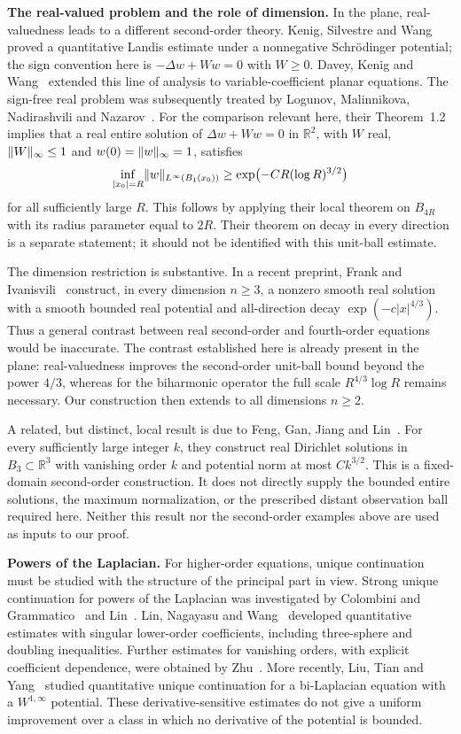 \documentclass[11pt,a4paper,leqno]{amsart}
\numberwithin{equation}{section}
\theoremstyle{landisplain}
\theoremstyle{landisdefinition}
\theoremstyle{landisremark}
\newcommand{\R}{\mathbb R}
\DeclarePairedDelimiter{\norm}{\lVert}{\rVert}
\begin{document}
\smallskip\noindent\textbf{The real-valued problem and the role of dimension.}
In the plane, real-valuedness leads to a different second-order
theory. Kenig, Silvestre and Wang~\cite{KSW} proved a quantitative
Landis estimate under a nonnegative Schr\"odinger potential; the
sign convention here is $-\Delta w+Ww=0$ with $W\ge0$.
Davey, Kenig and Wang~\cite{DKW} extended this line of analysis
to variable-coefficient planar equations. The sign-free real
problem was subsequently treated by Logunov, Malinnikova,
Nadirashvili and Nazarov~\cite{LMNN}. For the comparison relevant
here, their Theorem~1.2 implies that a real entire solution of
$\Delta w+Ww=0$ in $\R^2$, with $W$ real,
$\norm W_\infty\le1$ and $w(0)=\norm w_\infty=1$, satisfies
\[
 \inf_{|x_0|=R}\norm{w}_{L^\infty(B_1(x_0))}
 \ge \exp\bigl(-CR(\log R)^{3/2}\bigr)
\]
for all sufficiently large $R$. This follows by applying their
local theorem on $B_{4R}$ with its radius parameter equal to
$2R$. Their theorem on decay in every direction is a separate
statement; it should not be identified with this unit-ball estimate.

The dimension restriction is substantive. In a recent preprint,
Frank and Ivanisvili~\cite[Theorem~1]{FI} construct, in every
dimension $n\ge3$, a nonzero smooth real solution with a smooth
bounded real potential and all-direction decay
$\exp(-c|x|^{4/3})$. Thus a general contrast between real
second-order and fourth-order equations would be inaccurate.
The contrast established here is already present in the plane:
real-valuedness improves the second-order unit-ball bound beyond
the power $4/3$, whereas for the biharmonic operator the full
scale $R^{4/3}\log R$ remains necessary. Our construction then
extends to all dimensions $n\ge2$.

A related, but distinct, local result is due to Feng, Gan, Jiang
and Lin~\cite[Theorem~1.1]{FGJL}. For every sufficiently large
integer $k$, they construct real Dirichlet solutions in
$B_3\subset\R^3$ with vanishing order $k$ and potential norm
at most $Ck^{3/2}$. This is a fixed-domain second-order
construction. It does not directly supply the bounded entire
solutions, the maximum normalization, or the prescribed distant
observation ball required here. Neither this result nor the
second-order examples above are used as inputs to our proof.

\smallskip\noindent\textbf{Powers of the Laplacian.}
For higher-order equations, unique continuation must be studied
with the structure of the principal part in view. Strong unique
continuation for powers of the Laplacian was investigated by
Colombini and Grammatico~\cite{CG} and Lin~\cite{Lin07}.
Lin, Nagayasu and Wang~\cite{LNW} developed quantitative
estimates with singular lower-order coefficients, including
three-sphere and doubling inequalities. Further estimates for
vanishing orders, with explicit coefficient dependence, were
obtained by Zhu~\cite{Zhu16,Zhu18}. More recently, Liu, Tian
and Yang~\cite{LTY} studied quantitative unique continuation
for a bi-Laplacian equation with a $W^{1,\infty}$ potential.
These derivative-sensitive estimates do not give a uniform
improvement over a class in which no derivative of the potential
is bounded.
\end{document}
